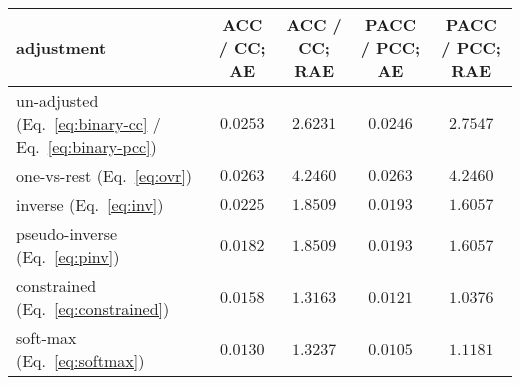 \begin{tabular}{lcccc}
  \toprule
    adjustment & ACC / CC; AE & ACC / CC; RAE & PACC / PCC; AE & PACC / PCC; RAE \\
  \midrule
    un-adjusted (Eq.~\ref{eq:binary-cc} / Eq.~\ref{eq:binary-pcc}) & ${0.0253}$ & ${2.6231}$ & ${0.0246}$ & ${2.7547}$ \\
    one-vs-rest (Eq.~\ref{eq:ovr}) & ${0.0263}$ & ${4.2460}$ & ${0.0263}$ & ${4.2460}$ \\
    inverse (Eq.~\ref{eq:inv}) & ${0.0225}$ & ${1.8509}$ & ${0.0193}$ & ${1.6057}$ \\
    pseudo-inverse (Eq.~\ref{eq:pinv}) & ${0.0182}$ & ${1.8509}$ & ${0.0193}$ & ${1.6057}$ \\
    constrained (Eq.~\ref{eq:constrained}) & ${0.0158}$ & $\mathbf{1.3163}$ & ${0.0121}$ & $\mathbf{1.0376}$ \\
    soft-max (Eq.~\ref{eq:softmax}) & $\mathbf{0.0130}$ & ${1.3237}$ & $\mathbf{0.0105}$ & ${1.1181}$ \\
  \bottomrule
\end{tabular}
